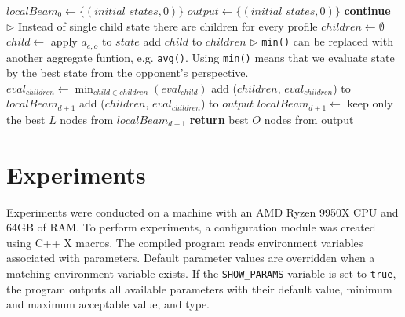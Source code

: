 \documentclass[shortabstract, mgr, english]{iithesis}
\newcommand{\LineComment}[1]{\enskip\(\triangleright\) #1}
\newcommand{\AbsoluteComment}[1]{\Statex \hspace*{-\algorithmicindent}\(\triangleright\) #1}
\begin{document}
\begin{algorithm}
\begin{algorithmic}[1]
    \State $localBeam_0 \gets \{(initial\_states, 0)\}$ 
    \State $output \gets \{(initial\_states, 0)\}$
                    \State \textbf{continue}
                \EndIf
                    \State \LineComment{Instead of single child state there are children for every profile}
                    \State $children \gets \emptyset$
                        \State $child \gets$ apply $a_{e,o}$ to $state$
                        \State add $child$ to $children$
                    \EndFor
                    \AbsoluteComment{\texttt{min()} can be replaced with another aggregate funtion, e.g. \texttt{avg()}. Using \texttt{min()} means that we evaluate state by the best state from the opponent's perspective.}
                    \State $eval_{children} \gets \min_{child\in children}{(eval_{child})}$
                    \State add ($children$, $eval_{children}$) to $localBeam_{d+1}$
                    \State add ($children$, $eval_{children}$) to $output$
                \EndFor
            \EndFor
                \State $localBeam_{d+1} \gets$ keep only the best $L$ nodes from $localBeam_{d+1}$
            \EndIf
        \EndFor
    \EndFor
    \State {}
    \State \textbf{return} best $O$ nodes from output
\EndProcedure
\end{algorithmic}
\end{algorithm}


\chapter{Experiments}
\label{chapter:Experiments}
Experiments were conducted on a machine with an AMD Ryzen 9950X CPU and 64GB of RAM.
To perform experiments, a configuration module was created using C++ X macros. The compiled program reads environment variables associated with parameters. Default parameter values are overridden when a matching environment variable exists. If the \texttt{SHOW\_PARAMS} variable is set to \texttt{true}, the program outputs all available parameters with their default value, minimum and maximum acceptable value, and type.
\end{document}
